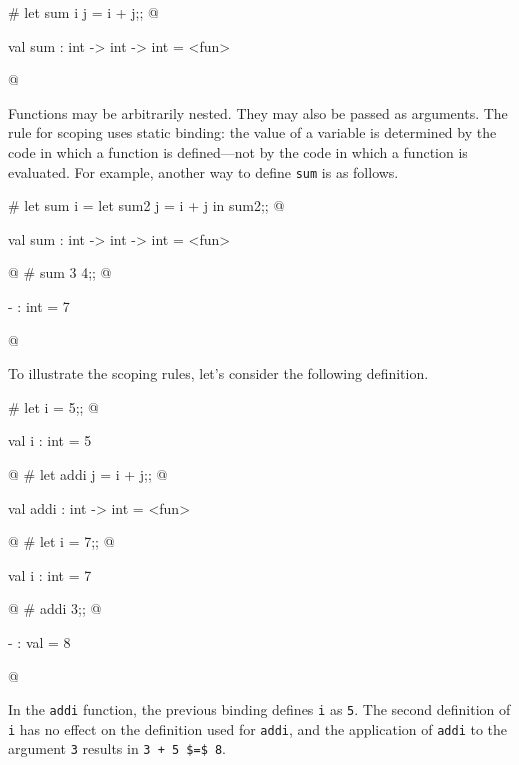 \begin{ocaml}
# let sum i j = i + j;;
@
\begin{topoutput}
val sum : int -> int -> int = <fun>
\end{topoutput}
@
\end{ocaml}


Functions may be arbitrarily nested.  They may also be
passed as arguments.  The rule for scoping uses static binding: the
value of a variable is determined by the code in which a function is
defined---not by the code in which a function is evaluated.  For
example, another way to define \hbox{\lstinline/sum/} is as follows.

\begin{ocaml}
# let sum i =
     let sum2 j =
        i + j
     in
        sum2;;
@
\begin{topoutput}
val sum : int -> int -> int = <fun>
\end{topoutput}
@
# sum 3 4;;
@
\begin{topoutput}
- : int = 7
\end{topoutput}
@
\end{ocaml}
%
To illustrate the scoping rules, let's consider the following
definition.

\begin{ocaml}
# let i = 5;;
@
\begin{topoutput}
val i : int = 5
\end{topoutput}
@
# let addi j =
     i + j;;
@
\begin{topoutput}
val addi : int -> int = <fun>
\end{topoutput}
@
# let i = 7;;
@
\begin{topoutput}
val i : int = 7
\end{topoutput}
@
# addi 3;;
@
\begin{topoutput}
- : val = 8
\end{topoutput}
@
\end{ocaml}
%
In the \hbox{\lstinline/addi/} function, the previous binding defines
\hbox{\lstinline/i/} as \hbox{\lstinline/5/}.  The second definition
of \hbox{\lstinline/i/} has no effect on the definition used for
\hbox{\lstinline/addi/}, and the application of
\hbox{\lstinline/addi/} to the argument \hbox{\lstinline/3/} results
in \hbox{\lstinline/3 + 5 $=$ 8/}.

\label{keyword:rec}

